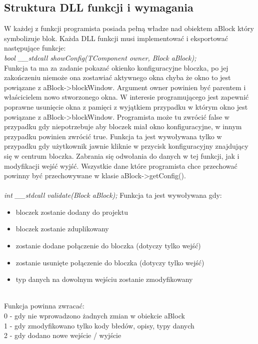 \subsection{Struktura DLL funkcji i wymagania}
W każdej z funkcji programista posiada pełną władze nad obiektem aBlock który symbolizuje blok.
Każda DLL funkcji musi implementować i eksportować następujące funkcje:\\
\textit{bool \_\_stdcall showConfig(TComponent \*owner, Block \*aBlock);}\\
Funkcja ta ma za zadanie pokazać okienko konfiguracyjne bloczka, po jej zakończeniu niemoże ona zostawiać aktywnego okna chyba że okno to jest powiązane z aBlock->blockWindow. Argument owner powinien być parentem i właścicielem nowo stworzonego okna. W interesie programującego jest zapewnić poprawne usunięcie okna z pamięci z wyjątkiem przypadku w którym okno jest powiązane z aBlock->blockWindow. Programista może tu zwrócić false w przypadku gdy niepotrzebuje aby bloczek miał okno konfiguracyjne, w innym przypadku powinien zwrócić true. Funkcja ta jest wywoływana tylko w przypadku gdy użytkownik jawnie kliknie w przycisk konfiguracyjny znajdujący się w centrum bloczka. Zabrania się odwołania do danych w tej funkcji, jak i modyfikacji wejść wyjść. Wszystkie dane które programista chce przechować powinny być przechowywane w klasie aBlock->getConfig().\\\\
\textit{int \_\_stdcall validate(Block \*aBlock);}
Funkcja ta jest wywoływana gdy:\\
\begin{itemize}
\item bloczek zostanie dodany do projektu
\item bloczek zostanie zduplikowany
\item zostanie dodane połączenie do bloczka (dotyczy tylko wejść)
\item zostanie usunięte połączenie do bloczka (dotyczy tylko wejść)
\item typ danych na dowolnym wejściu zostanie zmodyfikowany
\end{itemize}
\\
Funkcja powinna zwracać:\\
0 - gdy nie wprowadzono żadnych zmian w obiekcie aBlock\\
1 - gdy zmodyfikowano tylko kody błedów, opisy, typy danych\\
2 - gdy dodano nowe wejście / wyjście\\\\
